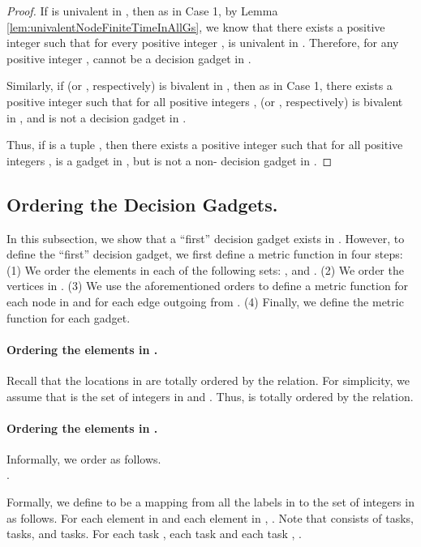 \documentclass[11pt]{article}
\numberwithin{theorem}{section}
\begin{document}
\begin{proof}
If  is univalent in , then as in Case 1, by Lemma \ref{lem:univalentNodeFiniteTimeInAllGs}, we know that there exists a positive integer  such that for every positive integer ,  is univalent in . Therefore, for any positive integer ,  cannot be a decision gadget in .

Similarly, if  (or , respectively) is bivalent in , then as in Case 1,  there exists a positive integer  such that for all positive integers ,  (or , respectively) is bivalent in , and  is not a decision gadget in . 

Thus, if  is a tuple , then there exists a positive integer  such that for all positive integers ,  is a gadget in , but  is not a non- decision gadget in .
\end{proof}










\subsection{Ordering the Decision Gadgets.}



In this subsection, we show
that a ``first'' decision gadget exists in . However, to define the ``first'' decision gadget, we first define a metric function 
in four steps: (1) We order the elements in each of the following sets: , and
. (2) We order the vertices in . (3) We use the aforementioned orders to define a metric function for each node  in  and for each edge outgoing from . (4) Finally, we define the metric function for each gadget.

\paragraph{Ordering the elements in .}
Recall that the locations in  are totally ordered by the  relation. For simplicity, we assume that  is the set of integers in  and . Thus,  is totally ordered by the  relation.



\paragraph{Ordering the elements in .}
Informally, we order  as follows.    \\  .

Formally, we define   to be a mapping from all the labels in  to the set of integers in  as follows. For each element  in  and each element  in , . Note that  consists of   tasks,   tasks, and   tasks. For each  task , each  task  and each  task , .
\end{document}
